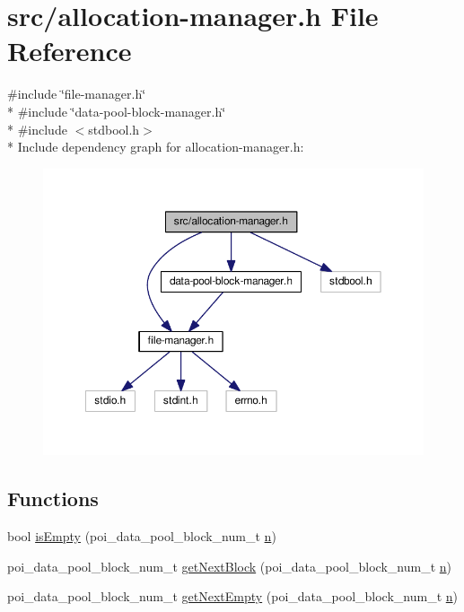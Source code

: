 \hypertarget{allocation-manager_8h}{\section{src/allocation-\/manager.h File Reference}
\label{allocation-manager_8h}
}
{\ttfamily \#include \char`\"{}file-\/manager.\-h\char`\"{}}\\*
{\ttfamily \#include \char`\"{}data-\/pool-\/block-\/manager.\-h\char`\"{}}\\*
{\ttfamily \#include $<$stdbool.\-h$>$}\\*
Include dependency graph for allocation-\/manager.h\-:
\nopagebreak
\begin{figure}[H]
\begin{center}
\leavevmode
\includegraphics[width=350pt]{allocation-manager_8h__incl}
\end{center}
\end{figure}
\subsection*{Functions}
\begin{DoxyCompactItemize}
\item 
bool \hyperlink{allocation-manager_8h_a56b807a333a2fc6f627265865c1e9f7d}{is\-Empty} (poi\-\_\-data\-\_\-pool\-\_\-block\-\_\-num\-\_\-t \hyperlink{allocation-table-test_8c_a24010dade8ebab3f87a48022772cd975}{n})
\item 
poi\-\_\-data\-\_\-pool\-\_\-block\-\_\-num\-\_\-t \hyperlink{allocation-manager_8h_aac60c48ce4acad3a1d8e459ba5649259}{get\-Next\-Block} (poi\-\_\-data\-\_\-pool\-\_\-block\-\_\-num\-\_\-t \hyperlink{allocation-table-test_8c_a24010dade8ebab3f87a48022772cd975}{n})
\item 
poi\-\_\-data\-\_\-pool\-\_\-block\-\_\-num\-\_\-t \hyperlink{allocation-manager_8h_a98a30f2070bd2d0ace14f19f86484d16}{get\-Next\-Empty} (poi\-\_\-data\-\_\-pool\-\_\-block\-\_\-num\-\_\-t \hyperlink{allocation-table-test_8c_a24010dade8ebab3f87a48022772cd975}{n})
\end{DoxyCompactItemize}
